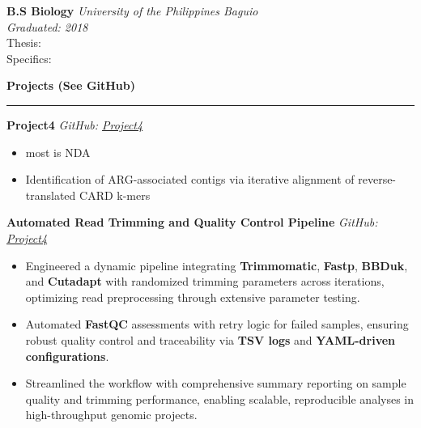 \documentclass[a4paper,10pt]{article}
\newcommand{\sectiontitle}[1]{\vspace{10pt}\textbf{\Large #1}\vspace{5pt}\hrule\vspace{10pt}}
\begin{document}
	\textbf{B.S Biology} \hfill \textit{University of the Philippines Baguio} \\
	\textit{Graduated: 2018} \\
	Thesis: \textit{} \\
	Specifics: 
	
	\sectiontitle{Projects (See GitHub)}
	\textbf{Project4} \hfill \textit{GitHub: \href{https://github.com/GABallena/Project4}{Project4}}
	\begin{itemize}[left=0pt]
		\item most is NDA
		\item Identification of ARG-associated contigs via iterative alignment of reverse-translated CARD k-mers
	\end{itemize}
	
	\textbf{Automated Read Trimming and Quality Control Pipeline} \hfill \textit{GitHub: \href{https://github.com/GABallena/Project4}{Project4}}
	\begin{itemize}[left=0pt]
		\item Engineered a dynamic pipeline integrating \textbf{Trimmomatic}, \textbf{Fastp}, \textbf{BBDuk}, and \textbf{Cutadapt} with randomized trimming parameters across iterations, optimizing read preprocessing through extensive parameter testing.
		\item Automated \textbf{FastQC} assessments with retry logic for failed samples, ensuring robust quality control and traceability via \textbf{TSV logs} and \textbf{YAML-driven configurations}.
		\item Streamlined the workflow with comprehensive summary reporting on sample quality and trimming performance, enabling scalable, reproducible analyses in high-throughput genomic projects.
	\end{itemize}
	
\end{document}
